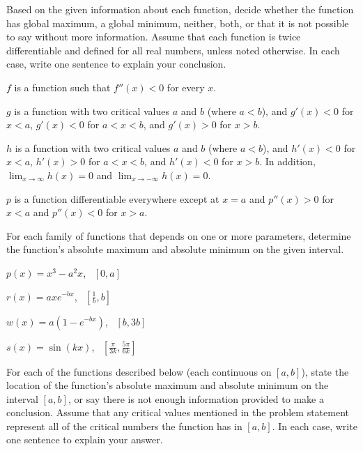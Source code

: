 \begin{exercises} 
	\item Based on the given information about each function, decide whether the function has global maximum, a global minimum, neither, both, or that it is not possible to say without more information.  Assume that each function is twice differentiable and defined for all real numbers, unless noted otherwise.  In each case, write one sentence to explain your conclusion.
	\ba
		\item $f$ is a function such that $f''(x) < 0$ for every $x$.
		\item $g$ is a function with two critical values $a$ and $b$ (where $a < b$), and $g'(x) < 0$ for $x < a$, $g'(x) < 0$ for $a < x < b$, and $g'(x) > 0$ for $x > b$.
		\item $h$ is a function with two critical values $a$ and $b$ (where $a < b$), and $h'(x) < 0$ for $x < a$, $h'(x) > 0$ for $a < x < b$, and $h'(x) < 0$ for $x > b$.  In addition, $\lim_{x \to \infty} h(x) = 0$ and $\lim_{x \to -\infty} h(x) = 0$.
		\item $p$ is a function differentiable everywhere except at $x = a$ and $p''(x) > 0$ for $x < a$ and $p''(x) < 0$ for $x > a$.
	\ea
	\item For each family of functions that depends on one or more parameters, determine the function's absolute maximum and absolute minimum on the given interval.
	\ba
		\item $p(x) = x^3 - a^2x$, \ $[0,a]$
		\item $r(x) = axe^{-bx}$, \  $[\frac{1}{b}, b]$
		\item $w(x) = a(1-e^{-bx})$, \  $[b, 3b]$
		\item $s(x) = \sin(kx)$, \  $[\frac{\pi}{3k}, \frac{5\pi}{6k}]$ 
	\ea
	\item For each of the functions described below (each continuous on $[a,b]$), state the location of the function's absolute maximum and absolute minimum on the interval $[a,b]$, or say there is not enough information provided to make a conclusion.  Assume that any critical values mentioned in the problem statement represent all of the critical numbers the function has in $[a,b]$.  In each case, write one sentence to explain your answer.


\end{exercises}
